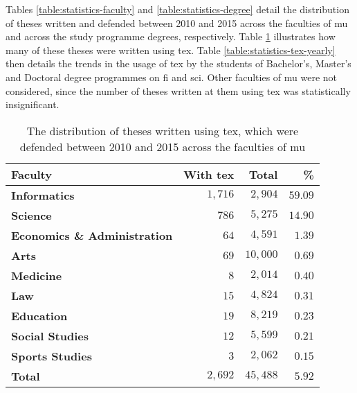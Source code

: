   Tables \ref{table:statistics-faculty} and \ref{table:statistics-degree} detail the distribution of theses written and defended between 2010 and 2015 across the faculties of \gls{mu} and across the study programme degrees, respectively. Table \ref{table:statistics-tex} illustrates how many of these theses were written using \gls{tex}. Table \ref{table:statistics-tex-yearly} then details the trends in the usage of \gls{tex} by the students of Bachelor's, Master's and Doctoral degree programmes on \gls{fi} and \gls{sci}. Other faculties of \gls{mu} were not considered, since the number of theses written at them using \gls{tex} was statistically insignificant.

  \begin{table}
    \caption{The distribution of theses written using \gls{tex}, which were defended between 2010 and 2015 across the faculties of \acrshort{mu}}
    \begin{tabularx}{\textwidth}{Xrrr}
      \textbf{Faculty} & \textbf{With \gls{tex}} & \textbf{Total} & \textbf{\%} \\
      \hline
      \textbf{Informatics}                 & $1{,}716$ & $2{,}904$  & $59.09$ \\%
      \textbf{Science}                     & $786$     & $5{,}275$  & $14.90$ \\%
      \textbf{Economics \& Administration} & $64$      & $4{,}591$  & $1.39$  \\%
      \textbf{Arts}                        & $69$      & $10{,}000$ & $0.69$  \\%
      \textbf{Medicine}                    & $8$       & $2{,}014$  & $0.40$  \\%
      \textbf{Law}                         & $15$      & $4{,}824$  & $0.31$  \\%
      \textbf{Education}                   & $19$      & $8{,}219$  & $0.23$  \\%
      \textbf{Social Studies}              & $12$      & $5{,}599$  & $0.21$  \\%
      \textbf{Sports Studies}              & $3$       & $2{,}062$  & $0.15$  \\%
      \hline
      \textbf{Total} & \textbf{$2{,}692$} & \textbf{$45{,}488$} & \textbf{$5.92$}
    \end{tabularx}
    \label{table:statistics-tex}
  \end{table}
  
